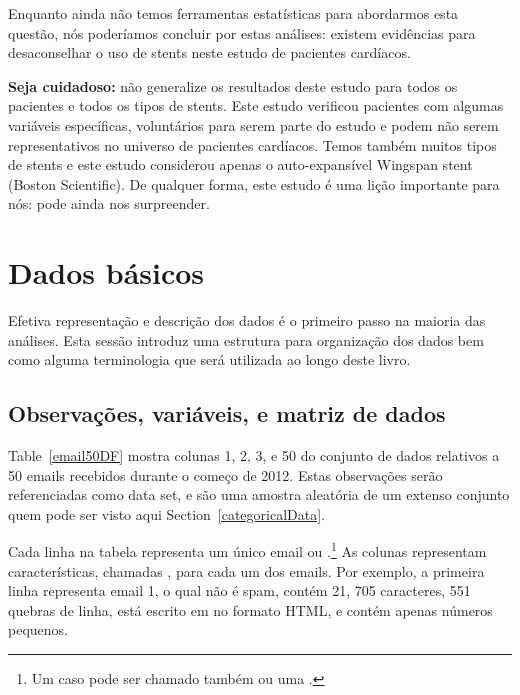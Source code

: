 Enquanto ainda não temos ferramentas estatísticas para abordarmos esta questão, nós poderíamos concluir por estas análises: existem evidências para desaconselhar o uso de stents neste estudo de pacientes cardíacos.

\textbf{Seja cuidadoso:} não generalize os resultados deste estudo para todos os pacientes e todos os tipos de stents. Este estudo verificou pacientes com algumas variáveis específicas, voluntários para serem parte do estudo e podem não serem representativos no universo de pacientes cardíacos. Temos também muitos tipos de stents e este estudo considerou apenas o auto-expansível Wingspan stent (Boston Scientific). De qualquer forma, este estudo é uma lição importante para nós: pode ainda nos surpreender.


\section[Dados básicos]{Dados básicos }
\label{dataBasics}

Efetiva representação e descrição dos dados é o primeiro passo na maioria das análises. Esta sessão introduz uma estrutura para organização dos dados bem como alguma terminologia que será utilizada ao longo deste livro.

\subsection{Observações, variáveis, e matriz de dados}


Table~\ref{email50DF} mostra colunas 1, 2, 3, e 50 do conjunto de dados relativos a 50 emails recebidos durante o começo de 2012. Estas observações serão referenciadas como  data set, e são uma amostra aleatória de um extenso conjunto quem pode ser visto aqui Section~\ref{categoricalData}.

Cada linha na tabela representa um único email ou .\footnote{Um caso pode ser chamado também  ou uma .} As colunas representam características, chamadas , para cada um dos emails. Por exemplo, a primeira linha representa email 1, o qual não é spam, contém 21, 705 caracteres, 551 quebras de linha, está escrito em no formato HTML, e contém apenas números pequenos.

